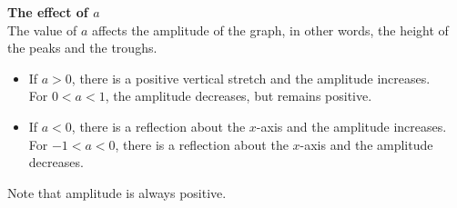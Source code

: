\textbf{The effect of $a$}
\\
The value of $a$ affects the amplitude of the graph, in other words, the height of the peaks and the troughs.
\begin{itemize}
 \item If $a>0$, there is a positive vertical stretch and the amplitude increases.\\
For $0<a<1$, the amplitude decreases, but remains positive.
\item If $a<0$, there is a reflection about the $x$-axis and the amplitude increases.\\ 
For $-1<a<0$, there is a reflection about the $x$-axis and the amplitude decreases.
\end{itemize}
Note that amplitude is always positive.








